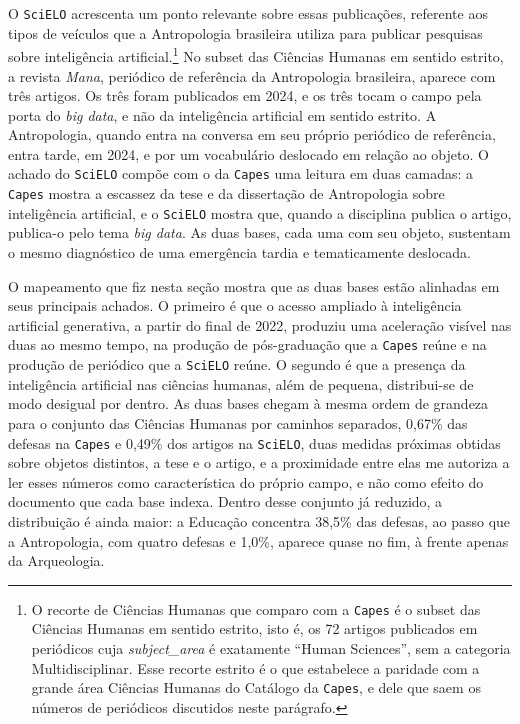 O \texttt{SciELO} acrescenta um ponto relevante sobre essas publicações, referente aos tipos de veículos que a Antropologia brasileira utiliza para publicar pesquisas sobre inteligência artificial.\footnote{O recorte de Ciências Humanas que comparo com a \texttt{Capes} é o subset das Ciências Humanas em sentido estrito, isto é, os 72 artigos publicados em periódicos cuja \emph{subject\_area} é exatamente \enquote{Human Sciences}, sem a categoria Multidisciplinar. Esse recorte estrito é o que estabelece a paridade com a grande área Ciências Humanas do Catálogo da \texttt{Capes}, e dele que saem os números de periódicos discutidos neste parágrafo.} No subset das Ciências Humanas em sentido estrito, a revista \textit{Mana}, periódico de referência da Antropologia brasileira, aparece com três artigos. Os três foram publicados em 2024, e os três tocam o campo pela porta do \emph{big data}, e não da inteligência artificial em sentido estrito. A Antropologia, quando entra na conversa em seu próprio periódico de referência, entra tarde, em 2024, e por um vocabulário deslocado em relação ao objeto. O achado do \texttt{SciELO} compõe com o da \texttt{Capes} uma leitura em duas camadas: a \texttt{Capes} mostra a escassez da tese e da dissertação de Antropologia sobre inteligência artificial, e o \texttt{SciELO} mostra que, quando a disciplina publica o artigo, publica-o pelo tema \emph{big data}. As duas bases, cada uma com seu objeto, sustentam o mesmo diagnóstico de uma emergência tardia e tematicamente deslocada.

O mapeamento que fiz nesta seção mostra que as duas bases estão alinhadas em seus principais achados. O primeiro é que o acesso ampliado à inteligência artificial generativa, a partir do final de 2022, produziu uma aceleração visível nas duas ao mesmo tempo, na produção de pós-graduação que a \texttt{Capes} reúne e na produção de periódico que a \texttt{SciELO} reúne. O segundo é que a presença da inteligência artificial nas ciências humanas, além de pequena, distribui-se de modo desigual por dentro. As duas bases chegam à mesma ordem de grandeza para o conjunto das Ciências Humanas por caminhos separados, 0,67\% das defesas na \texttt{Capes} e 0,49\% dos artigos na \texttt{SciELO}, duas medidas próximas obtidas sobre objetos distintos, a tese e o artigo, e a proximidade entre elas me autoriza a ler esses números como característica do próprio campo, e não como efeito do documento que cada base indexa. Dentro desse conjunto já reduzido, a distribuição é ainda maior: a Educação concentra 38,5\% das defesas, ao passo que a Antropologia, com quatro defesas e 1,0\%, aparece quase no fim, à frente apenas da Arqueologia.

